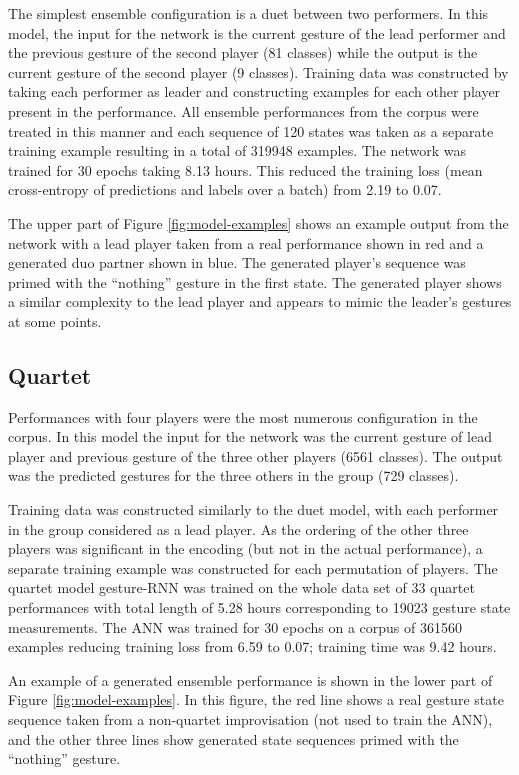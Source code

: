 \documentclass[sigchi]{acmart} %
\begin{document}
The simplest ensemble configuration is a duet between two performers.
In this model, the input for the network is the current gesture of the
lead performer and the previous gesture of the second player (81 classes) while the
output is the current gesture of the second player (9 classes). Training data was
constructed by taking each performer as leader and constructing
examples for each other player present in the performance. All
ensemble performances from the corpus were treated in this manner and
each sequence of 120 states was taken as a separate training example
resulting in a total of 319948 examples. The network was trained for
30 epochs taking 8.13 hours. This reduced the training loss (mean
cross-entropy of predictions and labels over a batch) from 2.19 to
0.07.

The upper part of Figure \ref{fig:model-examples} shows an example
output from the network with a lead player taken from a real
performance shown in red and a generated duo partner shown in blue.
The generated player's sequence was primed with the ``nothing''
gesture in the first state. The generated player shows a similar
complexity to the lead player and appears to mimic the leader's
gestures at some points.

\subsection{Quartet}

Performances with four players were the most numerous 
configuration in the corpus. In this model the input for the network
was the current gesture of lead player and previous gesture of the
three other players (6561 classes). The output was the predicted gestures for the
three others in the group (729 classes).

Training data was constructed similarly to the duet model, with each
performer in the group considered as a lead player. As the ordering of
the other three players was significant in the encoding (but not in
the actual performance), a separate training example was constructed
for each permutation of players. The quartet model gesture-RNN was
trained on the whole data set of 33 quartet performances with total
length of 5.28 hours corresponding to 19023 gesture state
measurements. The ANN was trained for 30 epochs on a corpus of 361560
examples reducing training loss from 6.59 to 0.07; training time was 9.42 hours.

An example of a generated ensemble performance is shown in the lower
part of Figure \ref{fig:model-examples}. In this figure, the red line
shows a real gesture state sequence taken from a non-quartet
improvisation (not used to train the ANN), and the other three lines
show generated state sequences primed with the ``nothing'' gesture.
\end{document}
